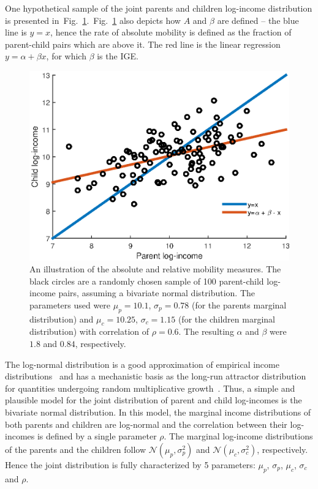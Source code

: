 \documentclass[12pt,a4paper]{article}
\newcommand{\flabel}[1]{\label{fig:#1}}
\newcommand{\fref}[1]{Fig.~\ref{fig:#1}}
\numberwithin{equation}{section}
\begin{document}
One hypothetical sample of the joint parents and children log-income distribution is presented in~\fref{lines}.~\fref{lines} also depicts how $A$ and $\beta$ are defined -- the blue line is $y=x$, hence the rate of absolute mobility is defined as the fraction of parent-child pairs which are above it. The red line is the linear regression $y=\alpha +\beta x$, for which $\beta$ is the IGE.

\begin{figure}[!htb]
\centering
\includegraphics[width=1.0\textwidth]{./figs/bivariate_lines3.eps}
\caption{An illustration of the absolute and relative mobility measures. The black circles are a randomly chosen sample of 100 parent-child log-income pairs, assuming a bivariate normal distribution. The parameters used were $\mu_p=10.1$, $\sigma_p=0.78$ (for the parents marginal distribution) and $\mu_c=10.25$, $\sigma_c=1.15$ (for the children marginal distribution) with correlation of $\rho=0.6$. The resulting $\alpha$ and $\beta$ were $1.8$ and $0.84$, respectively.}
\flabel{lines}
\end{figure}

The log-normal distribution is a good approximation of empirical income distributions~\citep{pinkovskiy2009parametric} and has a mechanistic basis as the long-run attractor distribution for quantities undergoing random multiplicative growth~\cite{aitchison1957,adamou2016}. Thus, a simple and plausible model for the joint distribution of parent and child log-incomes is the bivariate normal distribution. In this model, the marginal income distributions of both parents and children are log-normal and the correlation between their log-incomes is defined by a single parameter $\rho$. The marginal log-income distributions of the parents and the children follow $\mathcal{N}\left(\mu_p,\sigma_p^2\right)$ and $\mathcal{N}\left(\mu_c,\sigma_c^2\right)$, respectively. Hence the joint distribution is fully characterized by 5 parameters: $\mu_p$, $\sigma_p$, $\mu_c$, $\sigma_c$ and $\rho$.
\end{document}

